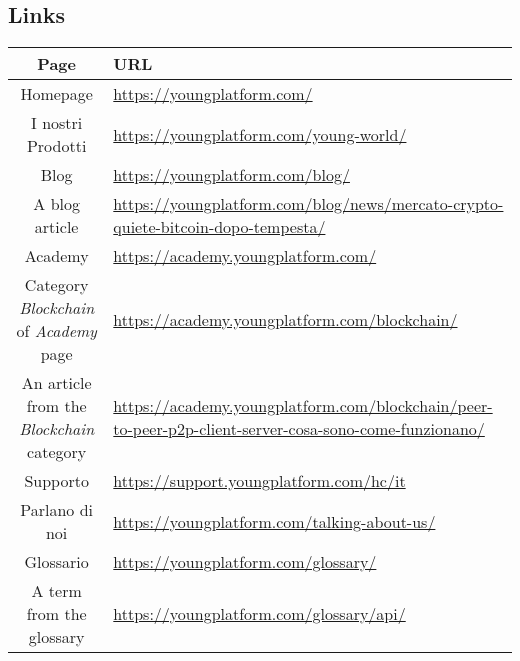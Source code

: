 \subsection{Links}

\begin{center}
  \begin{longtable}{|c|p{10.0cm}|}
    \hline
    \textbf{Page} & \textbf{URL} \\
    \hline
    Homepage & \href{https://youngplatform.com/}{https://youngplatform.com/} \\
    \hline
    I nostri Prodotti & \href{https://youngplatform.com/young-world/}{https://youngplatform.com/young-world/} \\
    \hline
    Blog & \href{https://youngplatform.com/blog/}{https://youngplatform.com/blog/} \\
    \hline
    A blog article & \href{https://youngplatform.com/blog/news/mercato-crypto-quiete-bitcoin-dopo-tempesta/}{https://youngplatform.com/blog/news/mercato-crypto-quiete-bitcoin-dopo-tempesta/} \\
    \hline
    Academy & \href{https://academy.youngplatform.com/}{https://academy.youngplatform.com/} \\
    \hline
    Category \textit{Blockchain} of \textit{Academy} page & \href{https://academy.youngplatform.com/blockchain/}{https://academy.youngplatform.com/blockchain/} \\
    \hline
    An article from the \textit{Blockchain} category & \href{https://academy.youngplatform.com/blockchain/peer-to-peer-p2p-client-server-cosa-sono-come-funzionano/}{https://academy.youngplatform.com/blockchain/peer-to-peer-p2p-client-server-cosa-sono-come-funzionano/} \\
    \hline
    Supporto & \href{https://support.youngplatform.com/hc/it}{https://support.youngplatform.com/hc/it} \\
    \hline
    Parlano di noi &  \href{https://youngplatform.com/talking-about-us/}{https://youngplatform.com/talking-about-us/} \\
    \hline
    Glossario & \href{https://youngplatform.com/glossary/}{https://youngplatform.com/glossary/} \\
    \hline
    A term from the glossary & \href{https://youngplatform.com/glossary/api/}{https://youngplatform.com/glossary/api/} \\
    \hline
  \end{longtable}
\end{center}